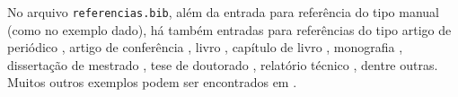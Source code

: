 No arquivo \texttt{referencias.bib}, além da entrada para referência do tipo manual (como no exemplo dado), há também entradas para referências do tipo artigo de periódico \cite{greenwade93}, artigo de conferência \cite{martin1997}, livro \cite{schaum1956}, capítulo de livro \cite{bates2010}, monografia \cite{morgado1990}, dissertação de mestrado \cite{macedo2005}, tese de doutorado \cite{guizzardi2005}, relatório técnico \cite{KrueBansBierDaziRash20}, dentre outras. Muitos outros exemplos podem ser encontrados em \cite{abntex2cite}.